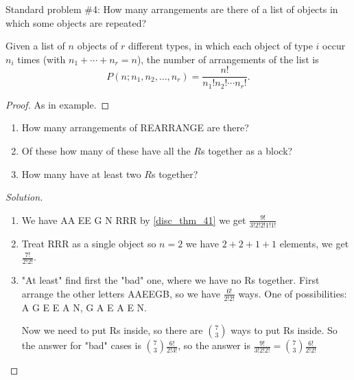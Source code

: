 \documentclass[10pt, a4paper]{article}
\begin{document}
Standard problem \#4: How many arrangements are there of a list of objects in which some objects are repeated?

\begin{theorem}\label{disc_thm_41}
    Given a list of $n$ objects of $r$ different types, in which each object of type $i$ occur $n_i$ times (with $n_1 + \dotsi + n_r = n$), the number of arrangements of the list is
    \[
    P(n; n_1, n_2, \dotsc, n_r) = \frac{n!}{n_1!n_2!\dotsi n_r!}.
    \]
    \begin{proof}
        As in example.
    \end{proof}
\end{theorem}

\begin{example}\phantom{}
    \begin{enumerate}[label = (D\arabic*)]
        \item  How many arrangements of REARRANGE are there?
        \item Of these how many of these have all the $R$s together as a block?
        \item How many have at least two $R$s together?
    \end{enumerate}

    \begin{proof}[Solution]\renewcommand{\qedsymbol}{}\phantom{}
        \begin{enumerate}[label = (D\arabic*)]
            \item
            We have
            AA EE G N RRR
            by \autoref{disc_thm_41} we get $\frac{9!}{3!2!2!1!1!}$
            \item Treat RRR as a single object so
            $n = 2$ we have $2 + 2 + 1 + 1$ elements,
            we get $\frac{7!}{2!2!}$.
            \item
            "At least" find first the "bad" one,
            where we have no Rs together.
            First arrange the other letters AAEEGB,
            so we have $\frac{6!}{2!2!}$ ways.
            One of possibilities: A G E E A N, G A E A E N.
            
            Now we need to put Rs inside,
            so there are $\binom{7}{3}$ ways to put Rs inside.
            So the answer for "bad" cases is $\binom{7}{3}\frac{6!}{2!3!}$,
            so the answer is $\frac{9!}{3!2!2!} = \binom{7}{3}\frac{6!}{2!2!}$
        \end{enumerate}
    \end{proof}
\end{example}
\end{document}
